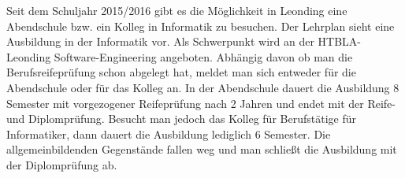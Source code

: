 Seit dem Schuljahr 2015/2016 gibt es die Möglichkeit in Leonding eine Abendschule bzw. ein Kolleg in Informatik zu besuchen.
Der Lehrplan sieht eine Ausbildung in der Informatik vor. 
Als Schwerpunkt wird an der HTBLA-Leonding Software-Engineering angeboten. 
Abhängig davon ob man die Berufsreifeprüfung schon abgelegt hat, meldet man sich entweder für die Abendschule oder für das Kolleg an. 
In der Abendschule dauert die Ausbildung 8 Semester mit vorgezogener Reifeprüfung nach 2 Jahren und endet mit der Reife- und Diplomprüfung.
Besucht man jedoch das Kolleg für Berufstätige für Informatiker, dann dauert die Ausbildung lediglich 6 Semester. 
Die allgemeinbildenden Gegenstände fallen weg und man schließt die Ausbildung mit der Diplomprüfung ab.
